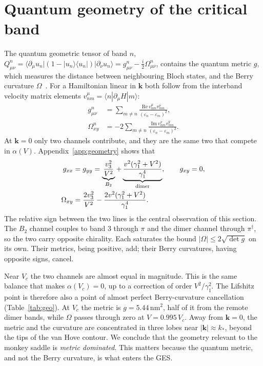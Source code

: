\documentclass[aps,prb,twocolumn,superscriptaddress,floatfix,nofootinbib]{revtex4-2}
\newcommand{\bk}{\mathbf{k}}
\newcommand{\nm}{\,\mathrm{nm}}
\begin{document}
\section{Quantum geometry of the critical band}\label{sec:geometry}

The quantum geometric tensor of band $n$,
$Q^n_{\mu\nu}=\langle\partial_\mu u_n|(1-|u_n\rangle\langle u_n|)|\partial_\nu u_n\rangle=g^n_{\mu\nu}-\tfrac i2\Omega^n_{\mu\nu}$,
contains the quantum metric $g$, which measures the distance between neighbouring Bloch states, and the Berry curvature $\Omega$~\cite{Provost1980}. For a Hamiltonian linear in $\bk$ both follow from the interband velocity matrix elements $v^\mu_{nm}=\langle n|\partial_\mu H|m\rangle$:
\begin{align}
g^n_{\mu\nu}&=\sum_{m\neq n}\frac{\mathrm{Re}\,v^\mu_{nm}v^\nu_{mn}}{(\varepsilon_n-\varepsilon_m)^2},\nonumber\\
\Omega^n_{xy}&=-2\sum_{m\neq n}\frac{\mathrm{Im}\,v^x_{nm}v^y_{mn}}{(\varepsilon_n-\varepsilon_m)^2}.
\label{eq:qgt}
\end{align}
At $\bk=0$ only two channels contribute, and they are the same two that compete in $\alpha(V)$. Appendix~\ref{app:geometry} shows that
\begin{align}
g_{xx}&=g_{yy}=\underbrace{\frac{v_3^2}{V^2}}_{B_2}+\underbrace{\frac{v^2(\gamma_1^2+V^2)}{\gamma_1^4}}_{\rm dimer},\qquad g_{xy}=0,\nonumber\\
\Omega_{xy}&=\frac{2v_3^2}{V^2}-\frac{2v^2(\gamma_1^2+V^2)}{\gamma_1^4}.
\label{eq:gOmega}
\end{align}
The relative sign between the two lines is the central observation of this section. The $B_2$ channel couples to band 3 through $\pi$ and the dimer channel through $\pi^\dagger$, so the two carry opposite chirality. Each saturates the bound $|\Omega|\le2\sqrt{\det g}$ on its own. Their metrics, being positive, add; their Berry curvatures, having opposite signs, cancel.

Near $V_c$ the two channels are almost equal in magnitude. This is the same balance that makes $\alpha(V_c)=0$, up to a correction of order $V^2/\gamma_1^2$. The Lifshitz point is therefore also a point of almost perfect Berry-curvature cancellation (Table~\ref{tab:geo}). At $V_c$ the metric is $g=5.44\nm^2$, half of it from the remote dimer bands, while $\Omega$ passes through zero at $V=0.995\,V_c$. Away from $\bk=0$, the metric and the curvature are concentrated in three lobes near $|\bk|\approx k_*$, beyond the tips of the van Hove contour. We conclude that the geometry relevant to the monkey saddle is \emph{metric dominated}. This matters because the quantum metric, and not the Berry curvature, is what enters the GES.
\end{document}
